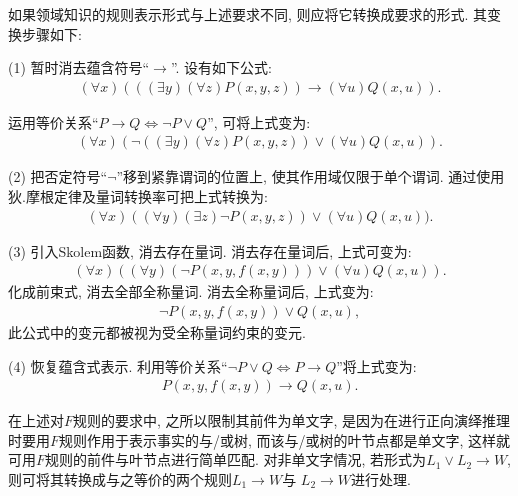 如果领域知识的规则表示形式与上述要求不同, 则应将它转换成要求的形式. 其变换步骤如下:

(1) 暂时消去蕴含符号“$\rightarrow$”. 设有如下公式:
\begin{align}
  (\forall x)(((\exists  y) (\forall  z)P(x, y,z))\rightarrow (\forall u)Q(x, u)).
\end{align}

运用等价关系“$P\rightarrow Q\Leftrightarrow \neg P\vee Q$”, 可将上式变为:
\begin{align}
  (\forall x)(\neg ((\exists   y) (\forall z)P(x, y,z))\vee (\forall u)Q(x, u)).
\end{align}

(2) 把否定符号“$\neg$”移到紧靠谓词的位置上, 使其作用域仅限于单个谓词. 通过使用狄.摩根定律及量词转换率可把上式转换为:
\begin{align}
  (\forall  x)( (\forall y) (\exists  z)\neg P(x, y,z))\vee  (\forall u)Q(x, u)).
\end{align}

(3) 引入Skolem函数, 消去存在量词. 消去存在量词后, 上式可变为:
\begin{align}
  (\forall  x)( (\forall y) (\neg P(x, y,f(x,y)))\vee (\forall u)Q(x, u)).
\end{align}
化成前束式, 消去全部全称量词. 消去全称量词后, 上式变为:
\begin{align}
  \neg P(x, y,f(x,y))\vee Q(x, u),
\end{align}
此公式中的变元都被视为受全称量词约束的变元.

(4) 恢复蕴含式表示. 利用等价关系“$\neg P\vee Q\Leftrightarrow P\rightarrow Q$”将上式变为:
\begin{align}
   P(x, y,f(x,y))\rightarrow Q(x, u).
\end{align}

在上述对$F$规则的要求中, 之所以限制其前件为单文字, 是因为在进行正向演绎推理时要用$F$规则作用于表示事实的与/或树, 而该与/或树的叶节点都是单文字, 这样就可用$F$规则的前件与叶节点进行简单匹配.
对非单文字情况, 若形式为$L_1\vee L_2\rightarrow W$, 则可将其转换成与之等价的两个规则$L_1\rightarrow W$与 $L_2\rightarrow W$进行处理.

